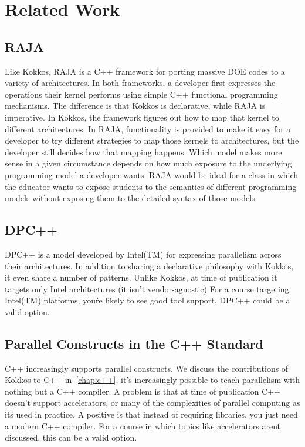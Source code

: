 \section{Related Work}\label{chap:related}
\subsection{RAJA}
Like Kokkos, RAJA is a C++ framework for porting massive DOE codes to a variety of architectures. In both frameworks, a developer first expresses the operations their kernel performs using simple C++ functional programming mechanisms. The difference is that Kokkos is declarative, while RAJA is imperative. In Kokkos, the framework figures out how to map that kernel to different architectures. In RAJA, functionality is provided to make it easy for a developer to try different strategies to map those kernels to architectures, but the developer still decides how that mapping happens. Which model makes more sense in a given circumstance depends on how much exposure to the underlying programming model a developer wants. RAJA would be ideal for a class in which the educator wants to expose students to the semantics of different programming models without exposing them to the detailed syntax of those models.
\subsection{DPC++}
DPC++ is a model developed by Intel(TM) for expressing parallelism across their architectures. In addition to sharing a declarative philosophy with Kokkos, it even share a number of patterns. Unlike Kokkos, at time of publication it targets only Intel architectures (it isn't vendor-agnostic) For a course targeting Intel(TM) platforms, you\'re likely to see good tool support, DPC++ could be a valid option.
\subsection{Parallel Constructs in the C++ Standard}
C++ increasingly supports parallel constructs. We discuss the contributions of Kokkos to C++ in~\ref{chap:c++}, it's increasingly possible to teach parallelism with nothing but a C++ compiler. A problem is that at time of publication C++ doesn't support accelerators, or many of the complexities of parallel computing as it\'s used in practice. A positive is that instead of requiring libraries, you just need a modern C++ compiler. For a course in which topics like accelerators aren\'t discussed, this can be a valid option.

